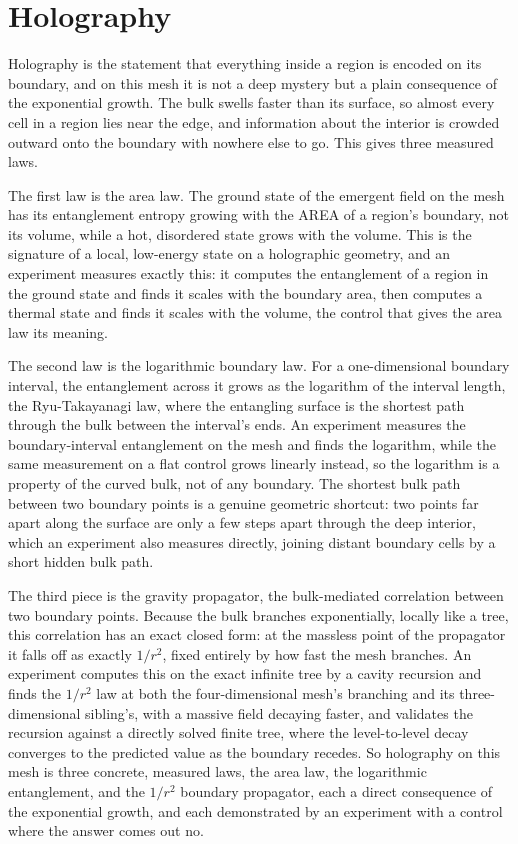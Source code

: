 \section{Holography}

Holography is the statement that everything inside a region is encoded on its boundary, and on this mesh it is not a
deep mystery but a plain consequence of the exponential growth. The bulk swells faster than its surface, so almost every
cell in a region lies near the edge, and information about the interior is crowded outward onto the boundary with
nowhere else to go. This gives three measured laws.

The first law is the area law. The ground state of the emergent field on the mesh has its entanglement entropy
growing with the AREA of a region's boundary, not its volume, while a hot, disordered state grows with the volume. This
is the signature of a local, low-energy state on a holographic geometry, and an experiment measures exactly this: it
computes the entanglement of a region in the ground state and finds it scales with the boundary area, then computes a
thermal state and finds it scales with the volume, the control that gives the area law its meaning.

The second law is the logarithmic boundary law. For a one-dimensional boundary interval, the entanglement across it
grows as the logarithm of the interval length, the Ryu-Takayanagi law, where the entangling surface is the shortest
path through the bulk between the interval's ends. An experiment measures the boundary-interval entanglement on the
mesh and finds the logarithm, while the same measurement on a flat control grows linearly instead, so the logarithm
is a property of the curved bulk, not of any boundary. The shortest bulk path between two boundary points is a genuine
geometric shortcut: two points far apart along the surface are only a few steps apart through the deep interior, which
an experiment also measures directly, joining distant boundary cells by a short hidden bulk path.

The third piece is the gravity propagator, the bulk-mediated correlation between two boundary points. Because the bulk
branches exponentially, locally like a tree, this correlation has an exact closed form: at the massless point of the
propagator it falls off as exactly $1/r^2$, fixed entirely by how fast the mesh branches. An experiment computes
this on the exact infinite tree by a cavity recursion and finds the $1/r^2$ law at both the four-dimensional mesh's
branching and its three-dimensional sibling's, with a massive field decaying faster, and validates the recursion
against a directly solved finite tree, where the level-to-level decay converges to the predicted value as the boundary
recedes. So holography on this mesh is three concrete, measured laws, the area law, the logarithmic entanglement, and
the $1/r^2$ boundary propagator, each a direct consequence of the exponential growth, and each demonstrated by an
experiment with a control where the answer comes out no.
